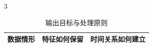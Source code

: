 \begin{PaperTable}{3}

\begin{table}[!htbp]
\centering\caption{输出目标与处理原则}
\begin{tabular}{@{}lll@{}}
\toprule
\begin{minipage}[b]{\dimexpr 0.240000\linewidth-0.960000\tabcolsep\relax}\raggedright
数据情形\strut
\end{minipage} & \begin{minipage}[b]{\dimexpr 0.350000\linewidth-1.400000\tabcolsep\relax}\raggedright
特征如何保留\strut
\end{minipage} & \begin{minipage}[b]{\dimexpr 0.410000\linewidth-1.640000\tabcolsep\relax}\raggedright
时间关系如何建立\strut
\end{minipage}\tabularnewline
\midrule


\end{tabular}
\end{table}
\end{PaperTable}
